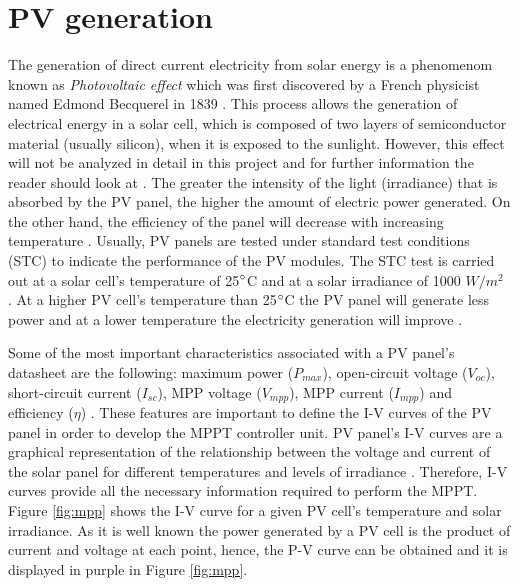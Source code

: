 \section{PV generation}

The generation of direct current electricity from solar energy is a phenomenom known as \textit{Photovoltaic effect} which was first discovered by a French physicist named Edmond Becquerel in 1839 \cite{PVeffect}. This process allows the generation of electrical energy in a solar cell, which is composed of two layers of semiconductor material (usually silicon), when it is exposed to the sunlight. However, this effect will not be analyzed in detail in this project and for further information the reader should look at \cite{PVeffect}. The greater the intensity of the light (irradiance) that is absorbed by the PV panel, the higher the amount of electric power generated. On the other hand, the efficiency of the panel will decrease with increasing temperature \cite{handbook}. Usually, PV panels are tested under standard test conditions (STC) to indicate the performance of the PV modules. The STC test is carried out at a solar cell's temperature of 25$\dec$C and at a solar irradiance of 1000 $W/ m^2$ \cite{handbook}. At a higher PV cell's temperature than 25$\dec$C the PV panel will generate less power and at a lower temperature the electricity generation will improve \cite{handbook}. %


Some of the most important characteristics associated with a PV panel’s datasheet are the following: maximum power ($P_{max}$), open-circuit voltage ($V_{oc}$), short-circuit current ($I_{sc}$), MPP voltage ($V_{mpp}$), MPP current ($I_{mpp}$) and efficiency ($\eta$) \cite{handbook}.  %
These features are important to define the I-V curves of the PV panel in order to develop the MPPT controller unit. PV panel's I-V curves are a graphical representation of the relationship between the voltage and current of the solar panel for different temperatures and levels of irradiance \cite{IVcurves}. Therefore, I-V curves provide all the necessary information required to perform the MPPT. Figure \ref{fig:mpp} shows the I-V curve for a given PV cell's temperature and solar irradiance. As it is well known the power generated by a PV cell is the product of current and voltage at each point, hence, the P-V curve can be obtained and it is displayed in purple in Figure \ref{fig:mpp}.  %

